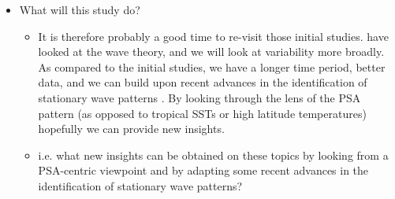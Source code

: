 \begin{itemize}
\item What will this study do?
\begin{itemize}
\item It is therefore probably a good time to re-visit those initial studies. \citet{Li2015} have looked at the wave theory, and we will look at variability more broadly. As compared to the initial studies, we have a longer time period, better data, and we can build upon recent advances in the identification of stationary wave patterns \citep[e.g.][]{Irving2015}. By looking through the lens of the PSA pattern (as opposed to tropical SSTs or high latitude temperatures) hopefully we can provide new insights.
\item i.e. what new insights can be obtained on these topics by looking from a PSA-centric viewpoint and by adapting some recent advances in the identification of stationary wave patterns?
\end{itemize}
\end{itemize}
  